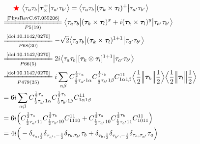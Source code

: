 \documentclass[master]{shnuthesis}
\newcommand{\ap}{a^\prime}
\newcommand{\bp}{b^\prime}
\newcommand{\il}{\!\!\!\!\!\!\!\!\!\!}
\newcommand{\zdydh}{\xlongequal}
\newcommand{\redstar}{{\color{red} \bigstar}\,\,}
\begin{document}
\begin{align}
    & \redstar \big\langle \tau_a\tau_b \big|\bm{\tau}_\times^+ \big|\tau_{\ap}\tau_{\bp}\big\rangle = \big\langle \tau_a\tau_b \big| (\bm{\tau}_k \times \bm{\tau}_l)^+ \big|\tau_{\ap}\tau_{\bp}\big\rangle \notag\\
    &\il \zdydh[P5(19)]{\text{\cite{PhysRevC.67.055206}}} \big\langle \tau_a\tau_b \big| (\bm{\tau}_k \times \bm{\tau}_l)^x + i(\bm{\tau}_k \times \bm{\tau}_l)^y \big|\tau_{\ap}\tau_{\bp}\big\rangle \\
    &\il \zdydh[P68(30)]{\text{\cite{doi:10.1142/0270}}} -\sqrt{2}\big\langle \tau_a\tau_b \big| (\bm{\tau}_k \times \bm{\tau}_l)^{1 +1} \big|\tau_{\ap}\tau_{\bp}\big\rangle \\
    &\il \zdydh[P66(5)]{\text{\cite{doi:10.1142/0270}}} 2i\big\langle \tau_a\tau_b \big| [\bm{\tau}_k \otimes \bm{\tau}_l]^{1+1} \big|\tau_{\ap}\tau_{\bp}\big\rangle \\
    &\il \zdydh[P479(25)]{\text{\cite{doi:10.1142/0270}}} i \sum_{\alpha\beta}C_{\frac{1}{2} \tau_{\ap} 1 \alpha}^{\frac{1}{2} \tau_a} C_{\frac{1}{2} \tau_{\bp} 1 \beta}^{\frac{1}{2} \tau_b}C_{1 \alpha 1 \beta}^{1 1} \Big\langle \frac{1}{2} \Big\| \bm{\tau}_k \Big\| \frac{1}{2} \Big\rangle \Big\langle \frac{1}{2} \Big\| \bm{\tau}_l \Big\| \frac{1}{2} \Big\rangle \\
    &\il = 6i \sum_{\alpha\beta}C_{\frac{1}{2} \tau_{\ap} 1 \alpha}^{\frac{1}{2} \tau_a} C_{\frac{1}{2} \tau_{\bp} 1 \beta}^{\frac{1}{2} \tau_b}C_{1 \alpha 1 \beta}^{1 1} \\
    &\il = 6i \Big( C_{\frac{1}{2} \tau_{\ap} 1 1}^{\frac{1}{2} \tau_a} C_{\frac{1}{2} \tau_{\bp} 1 0}^{\frac{1}{2} \tau_b}C_{1 1 1 0}^{1 1} + C_{\frac{1}{2} \tau_{\ap} 1 0}^{\frac{1}{2} \tau_a} C_{\frac{1}{2} \tau_{\bp} 1 1}^{\frac{1}{2} \tau_b}C_{1 0 1 1}^{1 1} \Big) \\
    &\il = 4i \Big( -\delta_{\tau_a,\frac{1}{2}}\delta_{\tau_{\ap},-\frac{1}{2}}\delta_{\tau_b,\tau_{\bp}}\tau_b + \delta_{\tau_b,\frac{1}{2}}\delta_{\tau_{\bp},-\frac{1}{2}}\delta_{\tau_a,\tau_{\ap}}\tau_a \Big) \label{tau-cha+}
\end{align}
\end{document}
